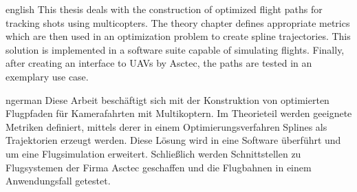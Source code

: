 \begin{myAbstract}{english}
This thesis deals with the construction of optimized flight paths for tracking shots using multicopters.
The theory chapter defines appropriate metrics which are then used in an optimization problem to create spline trajectories.
This solution is implemented in a software suite capable of simulating flights.
Finally, after creating an interface to UAVs by Asctec, the paths are tested in an exemplary use case.
\end{myAbstract}

\begin{myAbstract}{ngerman}
Diese Arbeit beschäftigt sich mit der Konstruktion von optimierten Flugpfaden für Kamerafahrten mit Multikoptern.
Im Theorieteil werden geeignete Metriken definiert, mittels derer in einem Optimierungsverfahren Splines als Trajektorien erzeugt werden.
Diese Lösung wird in eine Software überführt und um eine Flugsimulation erweitert.
Schließlich werden Schnittstellen zu Flugsystemen der Firma Asctec geschaffen und die Flugbahnen in einem Anwendungsfall getestet.
\end{myAbstract}

